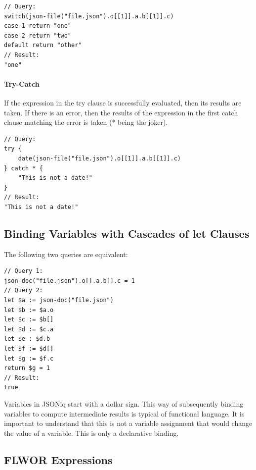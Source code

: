 \begin{lstlisting}[style=json]
// Query:
switch(json-file("file.json").o[[1]].a.b[[1]].c)
case 1 return "one"
case 2 return "two"
default return "other"
// Result:
"one"
\end{lstlisting}

\paragraph{Try-Catch}
If the expression in the try clause is successfully evaluated, then its results are taken. If there is an error, then the results of the expression in the first catch clause matching the error is taken (* being the joker).

\begin{lstlisting}[style=json]
// Query:
try {
    date(json-file("file.json").o[[1]].a.b[[1]].c)
} catch * {
    "This is not a date!"
}
// Result:
"This is not a date!"
\end{lstlisting}


\subsection{Binding Variables with Cascades of let Clauses}
The following two queries are equivalent:

\begin{lstlisting}[style=json]
// Query 1:
json-doc("file.json").o[].a.b[].c = 1
// Query 2:
let $a := json-doc("file.json")
let $b := $a.o
let $c := $b[]
let $d := $c.a
let $e : $d.b
let $f := $d[]
let $g := $f.c
return $g = 1
// Result:
true
\end{lstlisting}

Variables in JSONiq start with a dollar sign. This way of subsequently binding variables to compute intermediate results is typical of functional language.
It is important to understand that this is not a variable assignment that would change the value of a variable. This is only a declarative binding.

\subsection{FLWOR Expressions}

